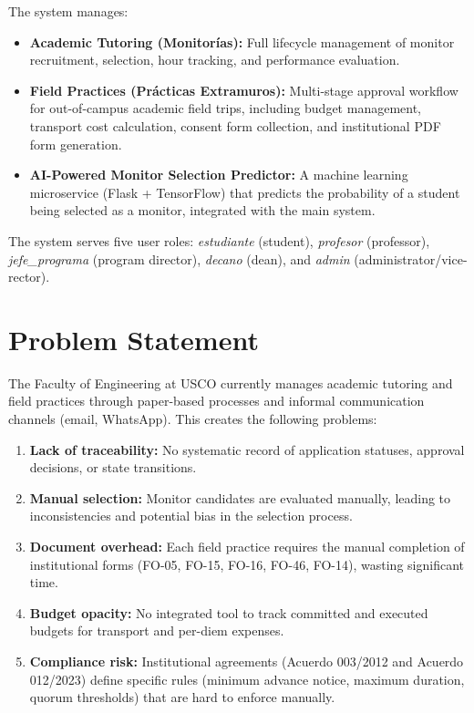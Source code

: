 \documentclass[12pt,a4paper]{article}
\newcommand{\role}[1]{\textit{\color{vinotinto}#1}}
\begin{document}
The system manages:
\begin{itemize}
  \item \textbf{Academic Tutoring (Monitorías):} Full lifecycle management of monitor
        recruitment, selection, hour tracking, and performance evaluation.
  \item \textbf{Field Practices (Prácticas Extramuros):} Multi-stage approval workflow for
        out-of-campus academic field trips, including budget management, transport cost
        calculation, consent form collection, and institutional PDF form generation.
  \item \textbf{AI-Powered Monitor Selection Predictor:} A machine learning microservice
        (Flask + TensorFlow) that predicts the probability of a student being selected as a
        monitor, integrated with the main system.
\end{itemize}

The system serves five user roles: \role{estudiante} (student), \role{profesor} (professor),
\role{jefe\_programa} (program director), \role{decano} (dean), and \role{admin}
(administrator/vice-rector).

\section{Problem Statement}

The Faculty of Engineering at USCO currently manages academic tutoring and field practices
through paper-based processes and informal communication channels (email, WhatsApp). This
creates the following problems:

\begin{enumerate}
  \item \textbf{Lack of traceability:} No systematic record of application statuses, approval
        decisions, or state transitions.
  \item \textbf{Manual selection:} Monitor candidates are evaluated manually, leading to
        inconsistencies and potential bias in the selection process.
  \item \textbf{Document overhead:} Each field practice requires the manual completion of
        institutional forms (FO-05, FO-15, FO-16, FO-46, FO-14), wasting significant time.
  \item \textbf{Budget opacity:} No integrated tool to track committed and executed budgets for
        transport and per-diem expenses.
  \item \textbf{Compliance risk:} Institutional agreements (Acuerdo 003/2012 and Acuerdo
        012/2023) define specific rules (minimum advance notice, maximum duration, quorum
        thresholds) that are hard to enforce manually.
\end{enumerate}
\end{document}
